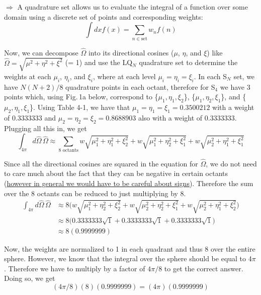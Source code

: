 \documentclass[10pt]{article}
\begin{document}
$\Rightarrow$ A quadrature set allows us to evaluate the integral of a function over some domain using a discrete set of points and corresponding weights:
%
\begin{equation*}
    \int dx f(x) = \sum_{n \in \textrm{set}} w_n f(n)
\end{equation*}

Now, we can decompose $\hat{\Omega}$ into its directional cosines ($\mu$, $\eta$, and $\xi$) like $\hat{\Omega} = \sqrt{\mu^2 + \eta^2 + \xi^2}$ (= 1) and use the LQ$_N$ quadrature set to determine the weights at each $\mu_i$, $\eta_i$, and $\xi_i$, where at each level $\mu_i = \eta_i = \xi_i$. In each S$_N$ set, we have $N(N+2)/8$ quadrature points in each octant, therefore for S$_4$ we have 3 points which, using Fig.\,1a below, correspond to \{$\mu_1, \eta_1, \xi_2$\}, \{$\mu_1, \eta_2, \xi_1$\}, and \{$\mu_2, \eta_1, \xi_1$\}. Using Table 4-1, we have that $\mu_1 = \eta_1 = \xi_1 = 0.3500212$ with a weight of 0.3333333 and $\mu_2 = \eta_2 = \xi_2 = 0.8688903$ also with a weight of 0.3333333. Plugging all this in, we get
%
\begin{equation*}
    \int_{4\pi} d\hat{\Omega}\,\hat{\Omega} \approx \sum_{\textrm{8 octants}} w\sqrt{\mu_1^2 + \eta_1^2 + \xi_2^2} + w\sqrt{\mu_1^2 + \eta_2^2 + \xi_1^2} + w\sqrt{\mu_2^2 + \eta_1^2 + \xi_1^2}
\end{equation*}

Since all the directional cosines are squared in the equation for $\hat{\Omega}$, we do not need to care much about the fact that they can be negative in certain octants (\ul{however in general we would have to be careful about signs}). Therefore the sum over the 8 octants can be reduced to just multiplying by 8.
%
\begin{align*}
        \int_{4\pi} d\hat{\Omega}\,\hat{\Omega} &\approx 8 \Big( w\sqrt{\mu_1^2 + \eta_2^2 + \xi_2^2} + w\sqrt{\mu_2^2 + \eta_2^2 + \xi_1^2} + w\sqrt{\mu_2^2 + \eta_1^2 + \xi_2^2} \Big) \\
        &\approx 8 \Big( 0.3333333\sqrt{1} + 0.3333333\sqrt{1} + 0.3333333\sqrt{1} \Big) \\
        &\approx 8 (0.9999999)
\end{align*}

Now, the weights are normalized to 1 in each quadrant and thus 8 over the entire sphere. However, we know that the integral over the sphere should be equal to 4$\pi$. Therefore we have to multiply by a factor of $4\pi /8$ to get the correct answer. Doing so, we get
%
\begin{equation*}
    (4\pi/8)(8)(0.9999999) = (4\pi)(0.9999999)
\end{equation*}
\end{document}
